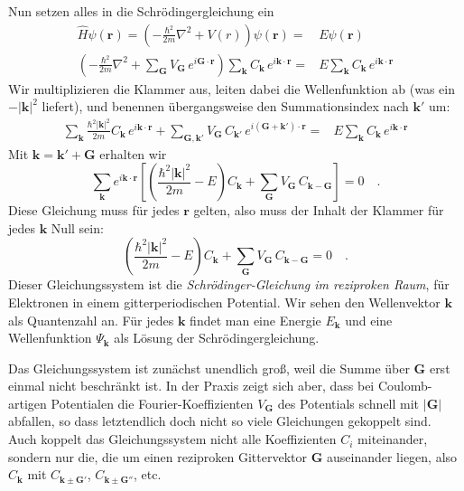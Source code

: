Nun setzen alles in die Schrödingergleichung ein
\begin{eqnarray}
    \hat{H}  \psi(\mathbf{r}) = \left( - \frac{\hbar^2}{2m} \nabla^2 + V(r) \right) \psi(\mathbf{r}) =  & E  \psi(\mathbf{r}) \\
     \left( - \frac{\hbar^2}{2m} \nabla^2 + \sum_{\mathbf{G}} V_{\mathbf{G}} \, e^{i \mathbf{G}  \cdot \mathbf{r} } \right) \sum_{\mathbf{k}} C_{\mathbf{k}} \, e^{i \mathbf{k} \cdot \mathbf{r} } =  & E  \sum_{\mathbf{k}} C_{\mathbf{k}} \, e^{i \mathbf{k} \cdot \mathbf{r} }
\end{eqnarray}
Wir multiplizieren die Klammer aus, leiten dabei die Wellenfunktion ab (was ein $- | \mathbf{k}|^2$ liefert), und benennen übergangsweise den Summationsindex nach $\mathbf{k}'$ um:
\begin{eqnarray}
    \sum_{\mathbf{k}}  \frac{\hbar^2 | \mathbf{k}|^2}{2m} C_{\mathbf{k}} \, e^{i \mathbf{k} \cdot \mathbf{r} } 
    + \sum_{\mathbf{G}, \mathbf{k}'} V_{\mathbf{G}} \, C_{\mathbf{k}'} \, e^{i (\mathbf{G}+\mathbf{k}')  \cdot \mathbf{r} }  
    =  & E  \sum_{\mathbf{k}} C_{\mathbf{k}} \,       e^{i \mathbf{k} \cdot \mathbf{r} } 
\end{eqnarray}
Mit $\mathbf{k} = \mathbf{k}' + \mathbf{G}$ erhalten wir 
\begin{equation}
    \sum_{\mathbf{k}}   e^{i \mathbf{k} \cdot \mathbf{r} } 
    \left[
        \left( \frac{\hbar^2 | \mathbf{k}|^2}{2m} - E \right) C_{\mathbf{k}}
    + \sum_{\mathbf{G}} V_{\mathbf{G}} \, C_{\mathbf{k}- \mathbf{G}} 
    \right]
    = 0  \quad .
\end{equation}
Diese Gleichung muss für jedes $\mathbf{r}$ gelten, also muss der Inhalt der Klammer für jedes $\mathbf{k}$  Null sein:
\begin{equation}
        \left( \frac{\hbar^2 | \mathbf{k}|^2}{2m} - E \right) C_{\mathbf{k}}
    + \sum_{\mathbf{G}} V_{\mathbf{G}} \, C_{\mathbf{k}- \mathbf{G}} 
    = 0  \quad . \label{eq:3_SG_rezi}
\end{equation}
Dieser Gleichungssystem ist die \emph{Schrödinger-Gleichung im reziproken Raum}, für Elektronen in einem gitterperiodischen Potential. Wir sehen den Wellenvektor $\mathbf{k}$ als Quantenzahl an. Für jedes $\mathbf{k}$ findet man eine Energie $E_\mathbf{k}$ und eine Wellenfunktion $\Psi_\mathbf{k}$ als Lösung der Schrödingergleichung.

Das Gleichungssystem  ist zunächst unendlich groß, weil die Summe über $\mathbf{G}$ erst einmal nicht beschränkt ist. In der Praxis zeigt sich aber, dass bei Coulomb-artigen Potentialen die Fourier-Koeffizienten  $ V_{\mathbf{G}} $ des Potentials schnell mit $|\mathbf{G}|$ abfallen, so dass letztendlich doch nicht so viele Gleichungen gekoppelt sind. 
Auch koppelt das Gleichungssystem nicht alle Koeffizienten $C_i$ miteinander, sondern nur die, die  um einen reziproken Gittervektor $\mathbf{G}$ auseinander liegen, also $C_\mathbf{k}$ mit $C_\mathbf{k \pm G'}$, $C_\mathbf{k \pm G''}$, etc. 

